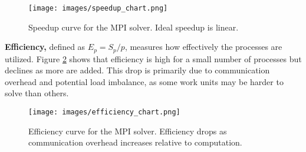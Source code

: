 \begin{figure}[htbp]
\centering
\texttt{[image: images/speedup\_chart.png]}
\caption{Speedup curve for the MPI solver. Ideal speedup is linear.}
\label{fig:speedup_chart}
\end{figure}

\textbf{Efficiency,} defined as $E_p = S_p / p$, measures how effectively the processes are utilized. Figure \ref{fig:efficiency_chart} shows that efficiency is high for a small number of processes but declines as more are added. This drop is primarily due to communication overhead and potential load imbalance, as some work units may be harder to solve than others.

\begin{figure}[htbp]
\centering
\texttt{[image: images/efficiency\_chart.png]}
\caption{Efficiency curve for the MPI solver. Efficiency drops as communication overhead increases relative to computation.}
\label{fig:efficiency_chart}
\end{figure}